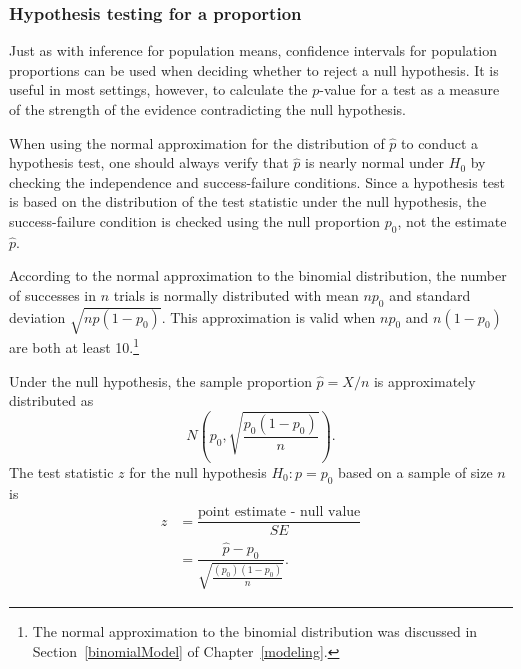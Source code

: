 \subsubsection{Hypothesis testing for a proportion}
\label{htForPropSection}

Just as with inference for population means, confidence intervals for population proportions can be used when deciding whether to reject a null hypothesis. It is useful in most settings, however, to calculate the $p$-value for a test as a measure of the strength of the evidence contradicting the null hypothesis.

When using the normal approximation for the distribution of $\hat{p}$ to conduct a hypothesis test, one should always verify that $\hat{p}$ is nearly normal under $H_0$ by checking the independence and success-failure conditions. Since a hypothesis test is based on the distribution of the test statistic under the null hypothesis, the success-failure condition is checked using the null proportion $p_0$, not the estimate $\hat{p}$.

According to the normal approximation to the binomial distribution, the number of successes in $n$ trials is normally distributed with mean $np_0$ and standard deviation $\sqrt{np(1-p_0)}$. This approximation is valid when $np_0$ and $n(1-p_0)$ are both at least 10.\footnote{The normal approximation to the binomial distribution was discussed in Section~\ref{binomialModel} of Chapter~\ref{modeling}.}

\textD{\newpage}

Under the null hypothesis, the sample proportion $\hat{p} = X/n$ is approximately distributed as
\[N \left(p_0, \sqrt{\frac{p_0(1-p_0)}{n}} \right).\]
The test statistic $z$ for the null hypothesis $H_0: p = p_0$ based on a sample of size $n$ is
\begin{align*}
  z &= \dfrac{\text{point estimate - null value}}{SE} \\
    &= \dfrac{\hat{p} - p_0}{\sqrt{\frac{(p_0)(1-p_0)}{n}}}.
\end{align*}

